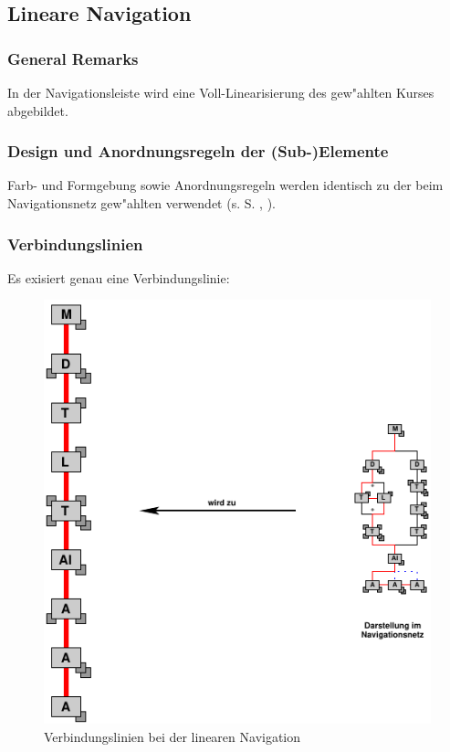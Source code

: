 \clearpage

\subsection{Lineare Navigation}\label{lineare_navigation}

\subsubsection{General Remarks}

In der Navigationsleiste wird eine Voll-Linearisierung des gew"ahlten
Kurses abgebildet.

\subsubsection{Design und Anordnungsregeln der (Sub-)Elemente}

Farb- und Formgebung sowie Anordnungsregeln werden identisch zu der
beim Navigationsnetz gew"ahlten verwendet
(s. S. \pageref{netz:design_sub_und_elemente},
\pageref{netz:anordnungsregeln}).

\subsubsection{Verbindungslinien}\label{}

Es exisiert genau eine Verbindungslinie:

\begin{figure}[h]
\begin{center}
\ifx\pdfoutput\undefined
\else
  \includegraphics{Skizzen/lineare_navi_wandel.pdf}
\fi
\caption{Verbindungslinien bei der linearen Navigation}
\end{center}
\end{figure}

